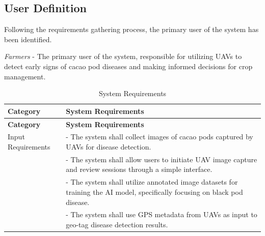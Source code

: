 \subsection*{User Definition}

Following the requirements gathering process, the primary user of the system has been identified.

\textit{Farmers} - The primary user of the system, responsible for utilizing UAVs to detect early signs of cacao pod diseases and making informed decisions for crop management.

\begin{longtable}{p{4cm} p{8cm}}
	\caption{System Requirements} \label{tab:sysreq}                                                                                                                                      \\

	\toprule
	\textbf{Category}        & \textbf{System Requirements}                                                                                                                               \\
	\midrule
	\endfirsthead

	\toprule
	\textbf{Category}        & \textbf{System Requirements}                                                                                                                               \\
	\midrule
	\endhead

	\bottomrule
	\endfoot

	Input Requirements       & - The system shall collect images of cacao pods captured by UAVs for disease detection.                                                                    \\
	                         & - The system shall allow users to initiate UAV image capture and review sessions through a simple interface.                                               \\
	                         & - The system shall utilize annotated image datasets for training the AI model, specifically focusing on black pod disease.                                 \\
	                         & - The system shall use GPS metadata from UAVs as input to geo-tag disease detection results.                                                               \\
	\midrule


\end{longtable}
